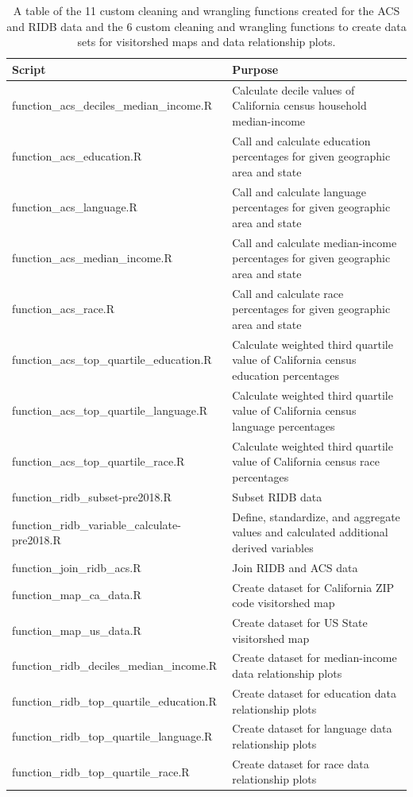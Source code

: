 \documentclass[
]{book}
\begin{document}
\begin{table}

\caption{\label{tab:func-table1}A table of the 11 custom cleaning and wrangling functions created for the ACS and RIDB data and the 6 custom cleaning and wrangling functions to create data sets for visitorshed maps and data relationship plots.}
\centering
\begin{tabular}[t]{l|l}
\hline
Script & Purpose\\
\hline
function\_acs\_deciles\_median\_income.R & Calculate decile values of California census household median-income\\
\hline
function\_acs\_education.R & Call and calculate education percentages for given geographic area and state\\
\hline
function\_acs\_language.R & Call and calculate language percentages for given geographic area and state\\
\hline
function\_acs\_median\_income.R & Call and calculate median-income percentages for given geographic area and state\\
\hline
function\_acs\_race.R & Call and calculate race percentages for given geographic area and state\\
\hline
function\_acs\_top\_quartile\_education.R & Calculate weighted third quartile value of California census education percentages\\
\hline
function\_acs\_top\_quartile\_language.R & Calculate weighted third quartile value of California census language percentages\\
\hline
function\_acs\_top\_quartile\_race.R & Calculate weighted third quartile value of California census race percentages\\
\hline
function\_ridb\_subset-pre2018.R & Subset RIDB data\\
\hline
function\_ridb\_variable\_calculate-pre2018.R & Define, standardize, and aggregate values and calculated additional derived variables\\
\hline
function\_join\_ridb\_acs.R & Join RIDB and ACS data\\
\hline
function\_map\_ca\_data.R & Create dataset for California ZIP code visitorshed map\\
\hline
function\_map\_us\_data.R & Create dataset for US State visitorshed map\\
\hline
function\_ridb\_deciles\_median\_income.R & Create dataset for median-income data relationship plots\\
\hline
function\_ridb\_top\_quartile\_education.R & Create dataset for education data relationship plots\\
\hline
function\_ridb\_top\_quartile\_language.R & Create dataset for language data relationship plots\\
\hline
function\_ridb\_top\_quartile\_race.R & Create dataset for race data relationship plots\\
\hline
\end{tabular}
\end{table}
\end{document}
